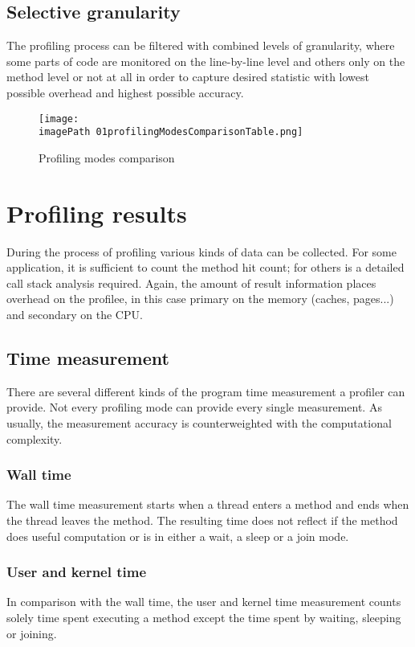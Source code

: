 \subsection{Selective granularity}
The profiling process can be filtered with combined levels of granularity, where some parts of code are monitored on the line-by-line level and others only on the method level or not at all in order to capture desired statistic with lowest possible overhead and highest possible accuracy.

\begin{figure}
	\centering
		\texttt{[image: \\imagePath 01profilingModesComparisonTable.png]}
		\caption{Profiling modes comparison}
	\label{fig:01profilingModesComparisonTable}
\end{figure}


\section{Profiling results}
During the process of profiling various kinds of data can be collected. For some application, it is sufficient to count the method hit count; for others is a detailed call stack analysis required. Again, the amount of result information places overhead on the profilee, in this case primary on the memory (caches, pages...) and secondary on the CPU.

\subsection{Time measurement}
There are several different kinds of the program time measurement a profiler can provide. Not every profiling mode can provide every single measurement. As usually, the measurement accuracy is counterweighted with the computational complexity.

\subsubsection*{Wall time}
The wall time measurement starts when a thread enters a method and ends when the thread leaves the method. The resulting time does not reflect if the method does useful computation or is in either a wait, a sleep or a join mode.

\subsubsection*{User and kernel time}
In comparison with the wall time, the user and kernel time measurement counts solely time spent executing a method except the time spent by waiting, sleeping or joining.

